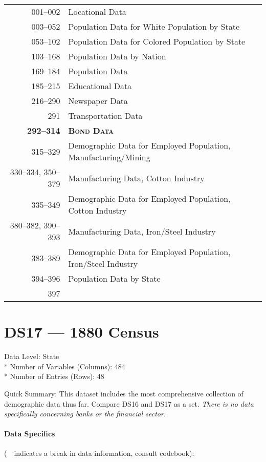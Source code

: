﻿\documentclass[12pt]{report}
\begin{document}
	\begin{tabular}{r|l}
		001--002 & Locational Data\\
		003--052 & Population Data for White Population by State\\
		053--102 & Population Data for Colored Population by State\\
		103--168 & Population Data by Nation\\
		169--184 & Population Data\\
		185--215 & Educational Data\\
		216--290 & Newspaper Data\\
		291 & Transportation Data\\
		\textbf{292--314} & \textsc{ \textbf{Bond Data} }\\
		315--329 & \parbox[t]{10cm}{Demographic Data for Employed Population,\\ Manufacturing/Mining}\\
		330--334, 350--379 & Manufacturing Data, Cotton Industry\\
		335--349 & Demographic Data for Employed Population, Cotton Industry\\
		380--382, 390--393 & Manufacturing Data, Iron/Steel Industry\\
		383--389 & \parbox[t]{10cm}{Demographic Data for Employed Population,\\ Iron/Steel Industry}\\
		394--396 & Population Data by State\\
		397 & \guillemotleft~\guillemotright
	\end{tabular}
	\newpage

\section{DS17 --- 1880 Census}
	Data Level: State\\*
	Number of Variables (Columns): 484\\*
	Number of Entries (Rows): 48
	\vspace{1.5em}
	
	\noindent Quick Summary: This dataset includes the most comprehensive collection of demographic data thus far. Compare DS16 and DS17 as a set. \textit{There is no data specifically concerning banks or the financial sector.}
	
	\paragraph{Data Specifics} (\guillemotleft~\guillemotright~indicates a break in data information, consult codebook):
	\vspace{1em}
	
\end{document}
